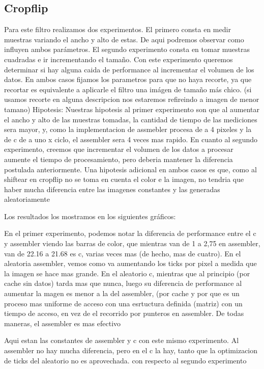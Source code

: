\subsection{Cropflip}
\hfill \break
Para este filtro realizamos dos experimentos. El primero consta en medir muestras variando el ancho y alto de estas. De aqui podremos observar como influyen ambos parámetros. El segundo experimento consta en tomar muestras cuadradas e ir incrementando el tamaño. Con este experimento queremos determinar si hay alguna caida de performance al incrementar el volumen de los datos. En ambos casos fijamos los parametros para que no haya recorte, ya que recortar es equivalente a aplicarle el filtro una imágen de tamaño más chico. (si usamos recorte en alguna descripcion nos estaremos refireindo a imagen de menor tamano)
\hfill \break
Hipotesis: Nuestras hipotesis al primer experimento son que al aumentar el ancho y alto de las muestras tomadas, la cantidad de tiempo de las mediciones sera mayor, y, como la implementacion de assmebler procesa de a 4 pixeles y la de c de a uno x ciclo,  el assembler sera 4 veces mas rapido.
En cuanto al segundo experimento, creemos que incrementar el volumen de los datos a procesar aumente el tiempo de procesamiento, pero deberia mantener la diferencia postulada anteriormente. 
Una hipotesis adicional en ambos casos es que, como al shiftear en cropflip no se toma en cuenta el color e la imagen, no tendria que haber mucha diferencia entre las imagenes constantes y las generadas aleatoriamente

\hfill \break
 Los resultados los mostramos en los siguientes gráficos:
 

\hfill \break


En el primer experimento, podemos notar la diferencia de performance entre el c y assembler viendo las barras de color, que mientras van de 1 a 2,75 en assembler, van de  22.16 a 21.68 es c, varias veces mas (de hecho, mas de cuatro). En el aleatoria assembler, vemos como va aumentando los ticks por pixel a medida que la imagen se hace mas grande. En el aleatorio c, mientras que al principio (por cache sin datos) tarda mas que nunca, luego su diferencia de performance al aumentar la magen es menor a la del assembler, (por cache y por que es un proceso mas uniforme de acceso con una esrtuctura definida (matriz) con un tiempo de acceso, en vez de el recorrido por punteros en assembler. De todas maneras, el assembler es mas efectivo


\hfill \break


Aqui estan las constantes de assembler y c con este mismo experimento. Al assembler no hay mucha diferencia, pero en el c la hay, tanto que la optimizacion de ticks del aleatorio no es aprovechada.
\hfill \break
con respecto al segundo experimento

